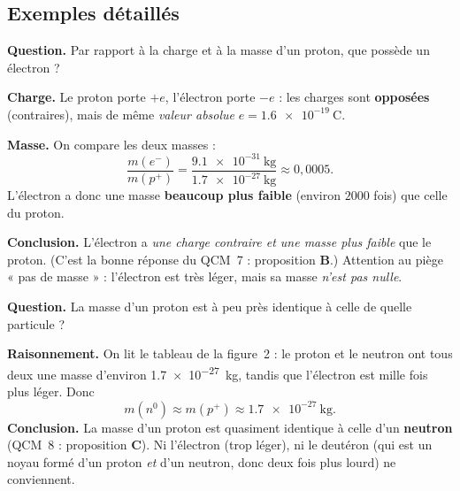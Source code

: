 \documentclass[11pt,a4paper]{article}
\newcommand{\pp}{p^{+}}      %
\newcommand{\ee}{e^{-}}      %
\newcommand{\nz}{n^{0}}      %
\begin{document}
\subsection{Exemples détaillés}

\begin{exemple}
\textbf{Question.} Par rapport à la charge et à la masse d'un proton, que possède un électron ?

\smallskip
\textbf{Charge.} Le proton porte $+e$, l'électron porte $-e$ : les charges sont \textbf{opposées}
(contraires), mais de même \emph{valeur absolue} $e = \SI{1,6e-19}{\coulomb}$.

\smallskip
\textbf{Masse.} On compare les deux masses :
\[ \frac{m(\ee)}{m(\pp)} = \frac{\SI{9,1e-31}{\kilo\gram}}{\SI{1,7e-27}{\kilo\gram}} \approx 0{,}0005. \]
L'électron a donc une masse \textbf{beaucoup plus faible} (environ $2000$ fois) que celle du proton.

\smallskip
\textbf{Conclusion.} L'électron a \emph{une charge contraire et une masse plus faible} que le proton.
(C'est la bonne réponse du QCM~7 : proposition \textbf{B}.) Attention au piège « pas de masse » :
l'électron est très léger, mais sa masse \emph{n'est pas nulle}.
\end{exemple}

\begin{exemple}
\textbf{Question.} La masse d'un proton est à peu près identique à celle de quelle particule ?

\smallskip
\textbf{Raisonnement.} On lit le tableau de la figure~2 : le proton et le neutron ont tous deux une
masse d'environ \SI{1,7e-27}{\kilo\gram}, tandis que l'électron est mille fois plus léger. Donc
\[ m(\nz) \approx m(\pp) \approx \SI{1,7e-27}{\kilo\gram}. \]
\textbf{Conclusion.} La masse d'un proton est quasiment identique à celle d'un \textbf{neutron}
(QCM~8 : proposition \textbf{C}). Ni l'électron (trop léger), ni le deutéron (qui est un noyau formé
d'un proton \emph{et} d'un neutron, donc deux fois plus lourd) ne conviennent.
\end{exemple}
\end{document}
